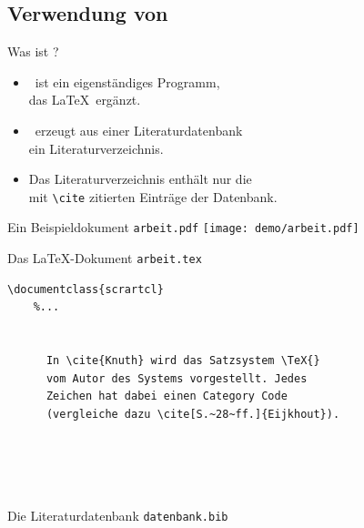 \jonny


\subsection{Verwendung von \BibTeX}

\begin{Frame}[fragile]{Was ist \BibTeX?}
  \begin{itemize}
    \item \BibTeX\ ist ein \alert{eigenständiges Programm},\\
    das \LaTeX\ ergänzt.
    \item \BibTeX\ erzeugt aus einer \alert{Literaturdatenbank}\\
      ein \alert{Literaturverzeichnis}.
    \item Das Literaturverzeichnis enthält \alert{nur} die\\
      mit \lstinline-\cite- \alert{zitierten Einträge} der Datenbank.
  \end{itemize}
\end{Frame}

\begin{Frame}[t]{Ein Beispieldokument \texttt{arbeit.pdf}}
  \texttt{[image: demo/arbeit.pdf]}
\end{Frame}

\begin{Frame}[fragile]{Das \LaTeX-Dokument \texttt{arbeit.tex}}
  \begin{lstlisting}[gobble=4]
    \documentclass{scrartcl}
    %...

    
      In \cite{Knuth} wird das Satzsystem \TeX{}
      vom Autor des Systems vorgestellt. Jedes
      Zeichen hat dabei einen Category Code
      (vergleiche dazu \cite[S.~28~ff.]{Eijkhout}).

      
      
    
  \end{lstlisting}
\end{Frame}

\begin{Frame}{Die Literaturdatenbank \texttt{datenbank.bib}}
  
\end{Frame}

